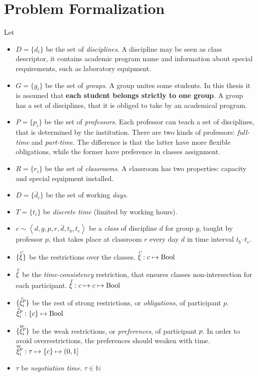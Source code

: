 \documentclass[ThesisDoc]{subfiles}
\begin{document}
\section{Problem Formalization}
\label{sec:ProblemFormal}



Let \begin{itemize}
\item $D=\{d_i\}$ be the set of \emph{disciplines}.
  A discipline may be seen as class descriptor, it contains
  academic program name and information about special requirements,
  such as laboratory equipment.
\item $G=\{g_i\}$ be the set of \emph{groups}.
  A group unites some students. In this thesis it is assumed that
  \textbf{each student belongs strictly to one group}.
  A group has a set of disciplines, that it is obliged to take by an
  academical program.
\item $P=\{p_i\}$ be the set of \emph{professors}.
  Each professor can teach a set of disciplines, that is determined
  by the institution. There are two kinds of professors:
  \emph{full-time} and \emph{part-time}. The difference is that the
  latter have more flexible obligations, while the former have preference
  in classes assignment.
\item $R=\{r_i\}$ be the set of \emph{classrooms}.
  A classroom has two properties: capacity and special equipment installed.
\item $D=\{\bar d_i\}$ be the set of working \emph{days}.
\item $T=\{t_i\}$ be \emph{discrete time} (limited by working hours).
\item $ c \sim \left< d, g, p, r, \bar d, t_b, t_e \right> $ be a \emph{class}
  of discipline $d$ for group $g$, taught by professor $p$, that takes place
  at classroom $r$ every day $d$ in time interval $t_b$--$t_e$.
\item $\{\accentset{C}{\xi}\}$ be the restrictions over the classes.
      $\accentset{C}{\xi} : c \mapsto \mathrm{Bool}$
\item $\accentset{T}{\xi}$ be the \emph{time-consistency} restriction, that ensures
  classes non-intersection for each participant.
      $\accentset{T}{\xi} : c \mapsto c \mapsto \mathrm{Bool}$
\item $\{\accentset{S}{\xi}^p_i\}$ be the rest of strong restrictions, or \emph{obligations},
      of participant $p$.
      $\accentset{S}{\xi}^p_i : \{c\} \mapsto \mathrm{Bool}$
\item $\{\accentset{W}{\xi}^p_i\}$ be the weak restrictions, or \emph{preferences}, of participant $p$.
      In order to avoid overrestrictions, the preferences should weaken with time.
      $\accentset{W}{\xi}^p_i : \tau \mapsto \{c\} \mapsto (0,1]$
\item $\tau$ be \emph{negotiation time}. $\tau \in \mathbb{N}$
\end{itemize}
\medskip
\end{document}
